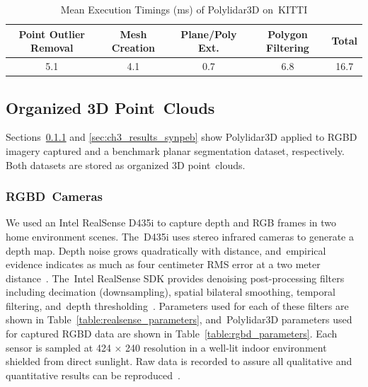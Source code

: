 \begin{table}[H]
\centering
\caption{Mean Execution Timings (ms) of Polylidar3D on~KITTI}
\label{table:kitti_timings}
\begin{tabular}{@{}ccccc@{}}
\toprule
\textbf{Point Outlier Removal} &\textbf{ Mesh Creation} & \textbf{Plane/Poly Ext.}  & \textbf{Polygon Filtering} & \textbf{Total}   \\ \midrule
5.1           &    4.1             & 0.7             & 6.8                 & 16.7 \\ \bottomrule
\end{tabular}
\end{table}
\unskip

\subsection{Organized 3D Point~Clouds}\label{sec:ch3_results_orgnaized}

Sections~\ref{sec:ch3_results_rgbd} and \ref{sec:ch3_results_synpeb} show Polylidar3D applied to RGBD imagery captured and a benchmark planar segmentation dataset, respectively.  Both datasets are stored as organized 3D point~clouds.

\subsubsection{RGBD~Cameras}\label{sec:ch3_results_rgbd} %

We used an Intel RealSense D435i to capture depth and RGB frames in two home environment scenes. The~D435i uses stereo infrared cameras to generate a depth map.  Depth noise grows quadratically with distance, and~empirical evidence indicates as much as four centimeter RMS error at a two meter distance~\cite{ahn_analysis_2019}. The~Intel RealSense SDK provides denoising post-processing filters including decimation (downsampling), spatial bilateral smoothing, temporal filtering, and~depth thresholding~\cite{noauthor_github_2019-1}. Parameters used for each of these filters are shown in Table~\ref{table:realsense_parameters}, and~Polylidar3D parameters used for captured RGBD data are shown in Table~\ref{table:rgbd_parameters}. Each sensor is sampled at 424 $\times$ 240 resolution in a well-lit indoor environment shielded from direct sunlight. Raw data is recorded to assure all qualitative and quantitative results can be reproduced~\cite{Castagno_Github_Polylidar3D_RealSense}.  


